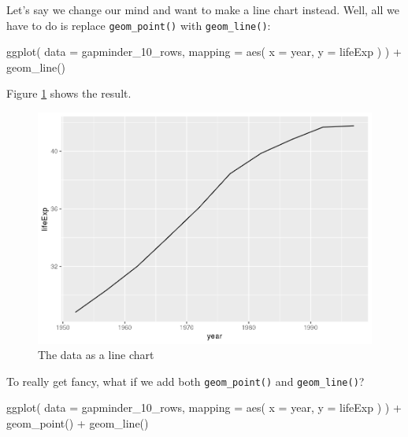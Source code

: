 \documentclass[
]{book}
\newenvironment{Shaded}{\begin{snugshade}}{\end{snugshade}}
\newcommand{\AttributeTok}[1]{\textcolor[rgb]{0.77,0.63,0.00}{#1}}
\newcommand{\FunctionTok}[1]{\textcolor[rgb]{0.00,0.00,0.00}{#1}}
\newcommand{\NormalTok}[1]{#1}
\newcommand{\SpecialCharTok}[1]{\textcolor[rgb]{0.00,0.00,0.00}{#1}}
\begin{document}
Let's say we change our mind and want to make a line chart instead. Well, all we have to do is replace \texttt{geom\_point()} with \texttt{geom\_line()}:

\begin{Shaded}
\begin{Highlighting}[]
\FunctionTok{ggplot}\NormalTok{(}
  \AttributeTok{data =}\NormalTok{ gapminder\_10\_rows,}
  \AttributeTok{mapping =} \FunctionTok{aes}\NormalTok{(}
    \AttributeTok{x =}\NormalTok{ year,}
    \AttributeTok{y =}\NormalTok{ lifeExp}
\NormalTok{  )}
\NormalTok{) }\SpecialCharTok{+}
  \FunctionTok{geom\_line}\NormalTok{()}
\end{Highlighting}
\end{Shaded}

Figure \ref{fig:gapminder-line-plot} shows the result.

\begin{figure}
\includegraphics[width=1\linewidth]{data-viz_files/figure-latex/gapminder-line-plot-1} \caption{The data as a line chart}\label{fig:gapminder-line-plot}
\end{figure}

To really get fancy, what if we add both \texttt{geom\_point()} and \texttt{geom\_line()}?

\begin{Shaded}
\begin{Highlighting}[]
\FunctionTok{ggplot}\NormalTok{(}
  \AttributeTok{data =}\NormalTok{ gapminder\_10\_rows,}
  \AttributeTok{mapping =} \FunctionTok{aes}\NormalTok{(}
    \AttributeTok{x =}\NormalTok{ year,}
    \AttributeTok{y =}\NormalTok{ lifeExp}
\NormalTok{  )}
\NormalTok{) }\SpecialCharTok{+}
  \FunctionTok{geom\_point}\NormalTok{() }\SpecialCharTok{+}
  \FunctionTok{geom\_line}\NormalTok{()}
\end{Highlighting}
\end{Shaded}
\end{document}
